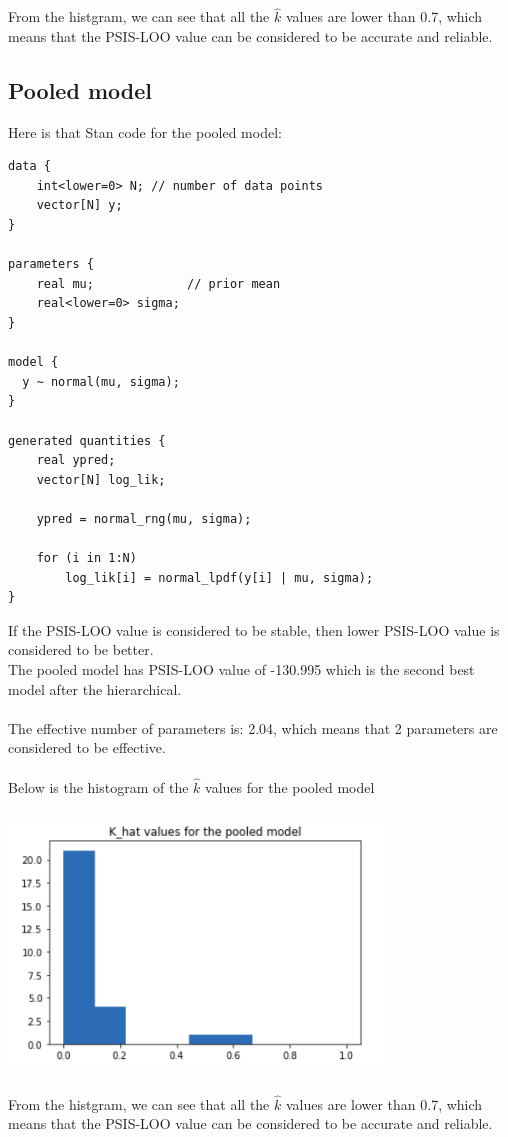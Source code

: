 \documentclass[17pt]{article}
\begin{document}
From the histgram, we can see that all the $ \hat{k} $ values are lower than 0.7, which means that the PSIS-LOO value can be considered to be accurate and reliable.


\subsection{Pooled model}
Here is that Stan code for the pooled model:

\begin{lstlisting}
data {
    int<lower=0> N; // number of data points
    vector[N] y;
}

parameters {
    real mu;             // prior mean
    real<lower=0> sigma;
}

model {
  y ~ normal(mu, sigma);
}

generated quantities {
    real ypred;
    vector[N] log_lik;
    
    ypred = normal_rng(mu, sigma);
    
    for (i in 1:N)
        log_lik[i] = normal_lpdf(y[i] | mu, sigma);   
}
\end{lstlisting}


If the PSIS-LOO value is considered to be stable, then lower PSIS-LOO value is considered to be better. \\
The pooled model has PSIS-LOO value of -130.995 which is the second best model after the hierarchical. \\~\\

The effective number of parameters is: 2.04, which means that 2 parameters are considered to be effective. \\~\\

Below is the histogram of the $ \hat{k} $ values for the pooled model

\begin{center}
\includegraphics[width=10cm, height=7cm]{pooled_model.png}
\end{center}

From the histgram, we can see that all the $ \hat{k} $ values are lower than 0.7, which means that the PSIS-LOO value can be considered to be accurate and reliable.
\end{document}
